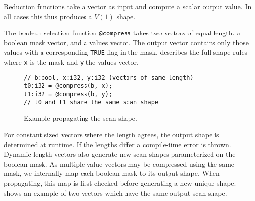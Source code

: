 Reduction functions take a vector as input and compute a scalar output value.  In all
cases this thus produces a $V(1)$ shape.

\begin{comment}
\begin{table}[htbp]
\centering
\caption{Rules for reduction functions (R)} \label{rule_reduction}
\begin{small}
\begin{tabular}{|c||c|c|c|c|}
\hline
$F_{R}$(x) & \shapeS & \shapeV{$c_0$} & \shapeV{$d_0$} & \shapeVS{$a_0$} \\ \hline
\hline
Return     & \shapeS & \shapeS & \shapeS & \shapeS \\ \hline
\end{tabular}
\end{small}
\end{table}
\end{comment}

The boolean selection function \texttt{@compress} takes two vectors of equal
length: a boolean mask vector, and a values vector. The output vector contains only
those values with a corresponding \texttt{TRUE} flag in the mask. 
describes the full shape rules where \texttt{x} is the mask and \texttt{y} the values
vector.

\begin{figure}[htbp]
\begin{lstlisting}[language=HorseIR, frame=single, basicstyle=\footnotesize, belowskip=0]
// b:bool, x:i32, y:i32 (vectors of same length)
t0:i32 = @compress(b, x);
t1:i32 = @compress(b, y);
// t0 and t1 share the same scan shape
\end{lstlisting}
\caption{Example propagating the scan shape.} \label{fig:scan_shape}
\end{figure}

For constant sized vectors where the length agrees, the output shape is determined at
runtime. If the lengths differ a compile-time error is thrown. Dynamic length vectors
also generate new scan shapes parameterized on the boolean mask. As multiple value
vectors may be compressed using the same mask, we internally map each boolean mask
to its output shape. When propagating, this map is first checked before generating
a new unique shape.  shows an example of two vectors which
have the same output scan shape.


